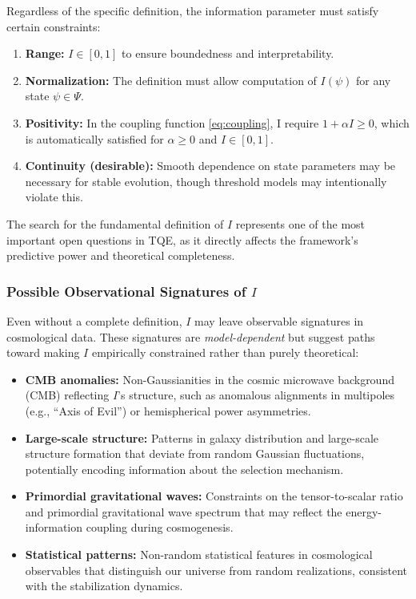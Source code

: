 \documentclass[12pt,a4paper]{article}
\theoremstyle{definition}
\theoremstyle{remark}
\begin{document}
Regardless of the specific definition, the information parameter must satisfy certain constraints:

\begin{enumerate}
\item \textbf{Range:} $I \in [0,1]$ to ensure boundedness and interpretability.
\item \textbf{Normalization:} The definition must allow computation of $I(\psi)$ for any state $\psi \in \Psi$.
\item \textbf{Positivity:} In the coupling function \eqref{eq:coupling}, I require $1 + \alpha I \geq 0$, which is automatically satisfied for $\alpha \geq 0$ and $I \in [0,1]$.
\item \textbf{Continuity (desirable):} Smooth dependence on state parameters may be necessary for stable evolution, though threshold models may intentionally violate this.
\end{enumerate}

The search for the fundamental definition of $I$ represents one of the most important open questions in TQE, as it directly affects the framework's predictive power and theoretical completeness.

\subsubsection{Possible Observational Signatures of $I$}

Even without a complete definition, $I$ may leave observable signatures in cosmological data. These signatures are \textit{model-dependent} but suggest paths toward making $I$ empirically constrained rather than purely theoretical:

\begin{itemize}
\item \textbf{CMB anomalies:} Non-Gaussianities in the cosmic microwave background (CMB) reflecting $I$'s structure, such as anomalous alignments in multipoles (e.g., ``Axis of Evil'') or hemispherical power asymmetries.
\item \textbf{Large-scale structure:} Patterns in galaxy distribution and large-scale structure formation that deviate from random Gaussian fluctuations, potentially encoding information about the selection mechanism.
\item \textbf{Primordial gravitational waves:} Constraints on the tensor-to-scalar ratio and primordial gravitational wave spectrum that may reflect the energy-information coupling during cosmogenesis.
\item \textbf{Statistical patterns:} Non-random statistical features in cosmological observables that distinguish our universe from random realizations, consistent with the stabilization dynamics.
\end{itemize}
\end{document}
